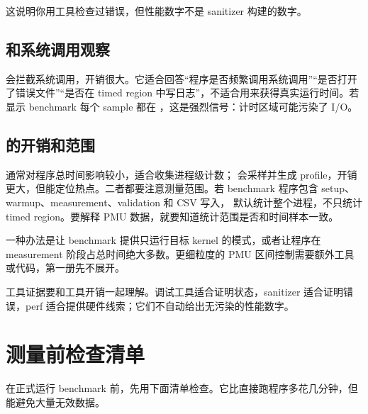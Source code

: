 这说明你用工具检查过错误，但性能数字不是 sanitizer 构建的数字。

\subsection{ 和系统调用观察}

 会拦截系统调用，开销很大。它适合回答“程序是否频繁调用系统调用”“是否打开了错误文件”“是否在 timed region 中写日志”，不适合用来获得真实运行时间。若  显示 benchmark 每个 sample 都在 ，这是强烈信号：计时区域可能污染了 I/O。

\subsection{ 的开销和范围}

 通常对程序总时间影响较小，适合收集进程级计数； 会采样并生成 profile，开销更大，但能定位热点。二者都要注意测量范围。若 benchmark 程序包含 setup、warmup、measurement、validation 和 CSV 写入， 默认统计整个进程，不只统计 timed region。要解释 PMU 数据，就要知道统计范围是否和时间样本一致。

一种办法是让 benchmark 提供只运行目标 kernel 的模式，或者让程序在 measurement 阶段占总时间绝大多数。更细粒度的 PMU 区间控制需要额外工具或代码，第一册先不展开。

\begin{warningbox}
工具证据要和工具开销一起理解。调试工具适合证明状态，sanitizer 适合证明错误，perf 适合提供硬件线索；它们不自动给出无污染的性能数字。
\end{warningbox}

\section{测量前检查清单}

在正式运行 benchmark 前，先用下面清单检查。它比直接跑程序多花几分钟，但能避免大量无效数据。

